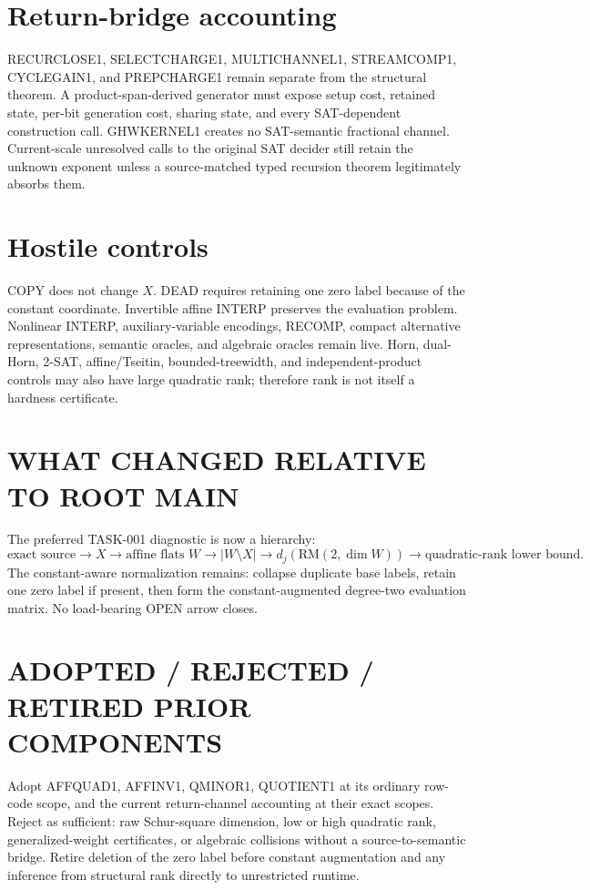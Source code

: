 \documentclass{article}
\begin{document}
\section*{Return-bridge accounting}
RECURCLOSE1, SELECTCHARGE1, MULTICHANNEL1, STREAMCOMP1, CYCLEGAIN1, and PREPCHARGE1 remain separate from the structural theorem. A product-span-derived generator must expose setup cost, retained state, per-bit generation cost, sharing state, and every SAT-dependent construction call. GHWKERNEL1 creates no SAT-semantic fractional channel. Current-scale unresolved calls to the original SAT decider still retain the unknown exponent unless a source-matched typed recursion theorem legitimately absorbs them.

\section*{Hostile controls}
COPY does not change \(X\). DEAD requires retaining one zero label because of the constant coordinate. Invertible affine INTERP preserves the evaluation problem. Nonlinear INTERP, auxiliary-variable encodings, RECOMP, compact alternative representations, semantic oracles, and algebraic oracles remain live. Horn, dual-Horn, 2-SAT, affine/Tseitin, bounded-treewidth, and independent-product controls may also have large quadratic rank; therefore rank is not itself a hardness certificate.

\section*{WHAT CHANGED RELATIVE TO ROOT MAIN}
The preferred TASK-001 diagnostic is now a hierarchy:
\[
\text{exact source}\to X\to
\text{affine flats }W\to
|W\setminus X|\to
d_j(\mathrm{RM}(2,\dim W))\to
\text{quadratic-rank lower bound}.
\]
The constant-aware normalization remains: collapse duplicate base labels, retain one zero label if present, then form the constant-augmented degree-two evaluation matrix. No load-bearing OPEN arrow closes.

\section*{ADOPTED / REJECTED / RETIRED PRIOR COMPONENTS}
Adopt AFFQUAD1, AFFINV1, QMINOR1, QUOTIENT1 at its ordinary row-code scope, and the current return-channel accounting at their exact scopes. Reject as sufficient: raw Schur-square dimension, low or high quadratic rank, generalized-weight certificates, or algebraic collisions without a source-to-semantic bridge. Retire deletion of the zero label before constant augmentation and any inference from structural rank directly to unrestricted runtime.
\end{document}
